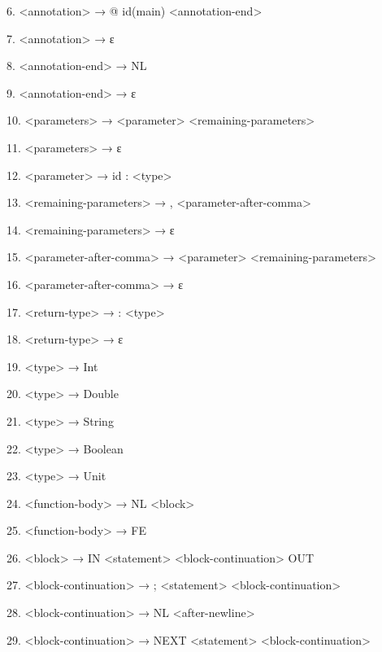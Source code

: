 \documentclass{article}
\begin{document}
6. \textless annotation\textgreater{} → @ id(main) \textless annotation-end\textgreater{}

7. \textless annotation\textgreater{} → ε

8. \textless annotation-end\textgreater{} → NL

9. \textless annotation-end\textgreater{} → ε

10. \textless parameters\textgreater{} → \textless parameter\textgreater{} \textless remaining-parameters\textgreater{}

11. \textless parameters\textgreater{} → ε

12. \textless parameter\textgreater{} → id : \textless type\textgreater{}

13. \textless remaining-parameters\textgreater{} → , \textless parameter-after-comma\textgreater{}

14. \textless remaining-parameters\textgreater{} → ε

15. \textless parameter-after-comma\textgreater{} → \textless parameter\textgreater{} \textless remaining-parameters\textgreater{}

16. \textless parameter-after-comma\textgreater{} → ε

17. \textless return-type\textgreater{} → : \textless type\textgreater{}

18. \textless return-type\textgreater{} → ε

19. \textless type\textgreater{} → Int

20. \textless type\textgreater{} → Double

21. \textless type\textgreater{} → String

22. \textless type\textgreater{} → Boolean

23. \textless type\textgreater{} → Unit

24. \textless function-body\textgreater{} → NL \textless block\textgreater{}

25. \textless function-body\textgreater{} → FE

26. \textless block\textgreater{} → IN \textless statement\textgreater{} \textless block-continuation\textgreater{} OUT

27. \textless block-continuation\textgreater{} → ; \textless statement\textgreater{} \textless block-continuation\textgreater{}

28. \textless block-continuation\textgreater{} → NL \textless after-newline\textgreater{}

29. \textless block-continuation\textgreater{} → NEXT \textless statement\textgreater{} \textless block-continuation\textgreater{}
\end{document}
